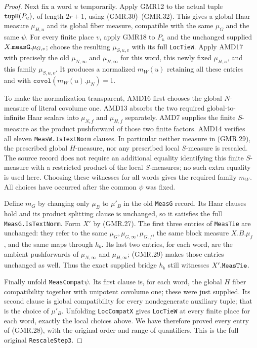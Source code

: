 \documentclass[11pt,a4paper]{article}
\numberwithin{equation}{section}
\theoremstyle{remark}\newtheorem{remark}[theorem]{Remark}
\begin{document}
\begin{proof}
Next fix a word $u$ temporarily.  Apply GMR12 to the actual tuple
$\texttt{tup\allowbreak H}(P_u)$, of length $2r+1$, using (GMR.30)--(GMR.32).
This gives a global Haar measure $\mu_{H,u}$ and its global fiber
measure, compatible with the same $\mu_G$ and the same $\psi$.
For every finite place $v$, apply GMR18 to $P_u$ and the unchanged
supplied $X.\texttt{meas\allowbreak G}.\mu_{G,v}$; choose the resulting
$\mu_{S,u,v}$ with its full \texttt{Loc\allowbreak Tie\allowbreak W}.
Apply AMD17 with precisely the old $\mu_{N,\infty}$ and
$\mu_{H,\infty}$ for this word, this newly fixed $\mu_{H,u}$,
and this family $\mu_{S,u,v}$.  It produces a normalized
$m_W(u)$ retaining all these entries and with
$\texttt{covol}(m_W(u).\mu_N)=1$.

To make the normalization transparent, AMD16 first chooses the
global $N$-measure of literal covolume one.  AMD13 absorbs the
two required global-to-infinite Haar scalars into $\mu_{N,f}$ and
$\mu_{H,f}$ separately.  AMD7 supplies the finite $S$-measure as
the product pushforward of those two finite factors.  AMD14 verifies
all eleven \texttt{Meas\allowbreak W.\allowbreak Is\allowbreak Text\allowbreak Norm} clauses.  In particular neither
measure in (GMR.29), the prescribed global $H$-measure, nor any
prescribed local $S$-measure is rescaled.  The source record does
not require an additional equality identifying this finite
$S$-measure with a restricted product of the local $S$-measures;
no such extra equality is used here.
Choosing these witnesses for all words gives the required family
$m_W$.  All choices have occurred after the common $\psi$ was fixed.

Define $m_G$ by changing only $\mu_B$ to $\mu'_B$ in the old
\texttt{Meas\allowbreak G} record.  Its Haar clauses hold and its product
splitting clause is unchanged, so it satisfies the full
\texttt{Meas\allowbreak G.\allowbreak Is\allowbreak Text\allowbreak Norm}.  Form $X'$ by (GMR.27).
The first three entries of \texttt{Meas\allowbreak Tie} are unchanged: they
refer to the same $\mu_G,\mu_{G,\infty},\mu_{G,f}$, the same
block measure $X.B.\mu_f$, and the same maps through $h_b$.
Its last two entries, for each word, are the ambient pushforwards
of $\mu_{N,\infty}$ and $\mu_{H,\infty}$; (GMR.29) makes those
entries unchanged as well.  Thus the exact supplied bridge $h_b$
still witnesses $X'.\texttt{Meas\allowbreak Tie}$.

Finally unfold \texttt{MeasCompat\ensuremath{\psi}}.  Its first clause is,
for each word, the global $H$ fiber compatibility together with
unipotent covolume one; these were just supplied.  Its second clause
is global compatibility for every nondegenerate auxiliary tuple;
that is the choice of $\mu'_B$.  Unfolding
\texttt{Loc\allowbreak Compat\allowbreak X} gives \texttt{Loc\allowbreak Tie\allowbreak W} at every finite place
for each word, exactly the local choices above.  We have therefore
proved every entry of (GMR.28), with the original order and range
of quantifiers.  This is the full original \texttt{Rescale\allowbreak Step3}.
\end{proof}
\end{document}
